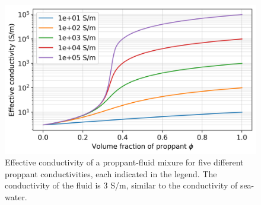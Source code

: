 \begin{figure}
    \begin{center}
    \includegraphics[width=\textwidth]{figures/phys_prop_model/emt_spherical_particles.png}
    \end{center}
\caption{
    Effective conductivity of a proppant-fluid mixure for five different proppant
    conductivities, each indicated in the legend.
    The conductivity of the fluid is 3 S/m, similar to the conductivity of sea-water.
}
\label{fig:emt_spherical_particles}
\end{figure}
